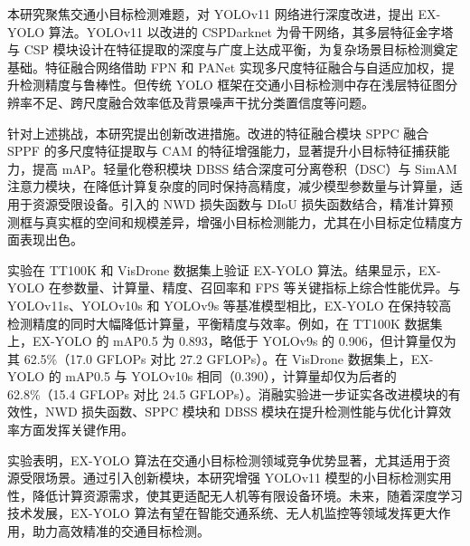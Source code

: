 本研究聚焦交通小目标检测难题，对 YOLOv11 网络进行深度改进，提出 EX-YOLO 算法。YOLOv11 以改进的 CSPDarknet 为骨干网络，其多层特征金字塔与 CSP 模块设计在特征提取的深度与广度上达成平衡，为复杂场景目标检测奠定基础。特征融合网络借助 FPN 和 PANet 实现多尺度特征融合与自适应加权，提升检测精度与鲁棒性。但传统 YOLO 框架在交通小目标检测中存在浅层特征图分辨率不足、跨尺度融合效率低及背景噪声干扰分类置信度等问题。

针对上述挑战，本研究提出创新改进措施。改进的特征融合模块 SPPC 融合 SPPF 的多尺度特征提取与 CAM 的特征增强能力，显著提升小目标特征捕获能力，提高 mAP。轻量化卷积模块 DBSS 结合深度可分离卷积（DSC）与 SimAM 注意力模块，在降低计算复杂度的同时保持高精度，减少模型参数量与计算量，适用于资源受限设备。引入的 NWD 损失函数与 DIoU 损失函数结合，精准计算预测框与真实框的空间和规模差异，增强小目标检测能力，尤其在小目标定位精度方面表现出色。

实验在 TT100K 和 VisDrone 数据集上验证 EX-YOLO 算法。结果显示，EX-YOLO 在参数量、计算量、精度、召回率和 FPS 等关键指标上综合性能优异。与 YOLOv11s、YOLOv10s 和 YOLOv9s 等基准模型相比，EX-YOLO 在保持较高检测精度的同时大幅降低计算量，平衡精度与效率。例如，在 TT100K 数据集上，EX-YOLO 的 mAP0.5 为 0.893，略低于 YOLOv9s 的 0.906，但计算量仅为其 62.5\%（17.0 GFLOPs 对比 27.2 GFLOPs）。在 VisDrone 数据集上，EX-YOLO 的 mAP0.5 与 YOLOv10s 相同（0.390），计算量却仅为后者的 62.8\%（15.4 GFLOPs 对比 24.5 GFLOPs）。消融实验进一步证实各改进模块的有效性，NWD 损失函数、SPPC 模块和 DBSS 模块在提升检测性能与优化计算效率方面发挥关键作用。

实验表明，EX-YOLO 算法在交通小目标检测领域竞争优势显著，尤其适用于资源受限场景。通过引入创新模块，本研究增强 YOLOv11 模型的小目标检测实用性，降低计算资源需求，使其更适配无人机等有限设备环境。未来，随着深度学习技术发展，EX-YOLO 算法有望在智能交通系统、无人机监控等领域发挥更大作用，助力高效精准的交通目标检测。